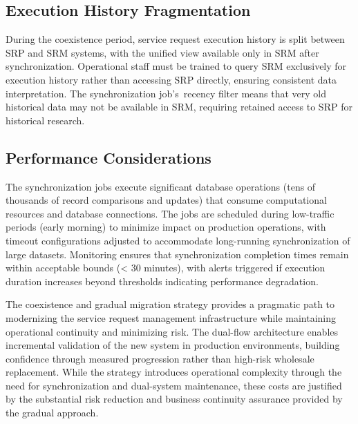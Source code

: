\subsection{Execution History Fragmentation}

During the coexistence period, service request execution history is split between SRP and SRM systems, with the unified view available only in SRM after synchronization. Operational staff must be trained to query SRM exclusively for execution history rather than accessing SRP directly, ensuring consistent data interpretation. The synchronization job's~recency filter means that very old historical data may not be available in SRM, requiring retained access to SRP for historical research.

\subsection{Performance Considerations}

The synchronization jobs execute significant database operations (tens of thousands of record comparisons and updates) that consume computational resources and database connections. The jobs are scheduled during low-traffic periods (early morning) to minimize impact on production operations, with timeout configurations adjusted to accommodate long-running synchronization of large datasets. Monitoring ensures that synchronization completion times remain within acceptable bounds (< 30 minutes), with alerts triggered if execution duration increases beyond thresholds indicating performance degradation.

The coexistence and gradual migration strategy provides a pragmatic path to modernizing the service request management infrastructure while maintaining operational continuity and minimizing risk. The dual-flow architecture enables incremental validation of the new system in production environments, building confidence through measured progression rather than high-risk wholesale replacement. While the strategy introduces operational complexity through the need for synchronization and dual-system maintenance, these costs are justified by the substantial risk reduction and business continuity assurance provided by the gradual approach.
